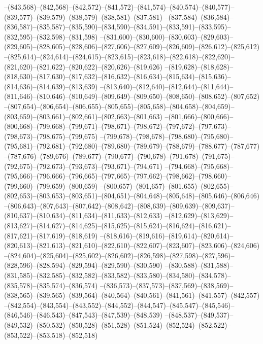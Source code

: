 --(843,568)--(842,568)--(842,572)--(841,572)--(841,574)--(840,574)--(840,577)--(839,577)--(839,579)--(838,579)--(838,581)--(837,581)
--(837,584)--(836,584)--(836,587)--(835,587)--(835,590)--(834,590)--(834,591)--(833,591)--(833,595)--(832,595)--(832,598)--(831,598)
--(831,600)--(830,600)--(830,603)--(829,603)--(829,605)--(828,605)--(828,606)--(827,606)--(827,609)--(826,609)--(826,612)--(825,612)
--(825,614)--(824,614)--(824,615)--(823,615)--(823,618)--(822,618)--(822,620)--(821,620)--(821,622)--(820,622)--(820,626)--(819,626)
--(819,628)--(818,628)--(818,630)--(817,630)--(817,632)--(816,632)--(816,634)--(815,634)--(815,636)--(814,636)--(814,639)--(813,639)
--(813,640)--(812,640)--(812,644)--(811,644)--(811,646)--(810,646)--(810,649)--(809,649)--(809,650)--(808,650)--(808,652)--(807,652)
--(807,654)--(806,654)--(806,655)--(805,655)--(805,658)--(804,658)--(804,659)--(803,659)--(803,661)--(802,661)--(802,663)--(801,663)
--(801,666)--(800,666)--(800,668)--(799,668)--(799,671)--(798,671)--(798,672)--(797,672)--(797,673)--(798,673)--(798,675)--(799,675)
--(799,678)--(798,678)--(798,680)--(795,680)--(795,681)--(792,681)--(792,680)--(789,680)--(789,679)--(788,679)--(788,677)--(787,677)
--(787,676)--(789,676)--(789,677)--(790,677)--(790,678)--(791,678)--(791,675)--(792,675)--(792,673)--(793,673)--(793,671)--(794,671)
--(794,668)--(795,668)--(795,666)--(796,666)--(796,665)--(797,665)--(797,662)--(798,662)--(798,660)--(799,660)--(799,659)--(800,659)
--(800,657)--(801,657)--(801,655)--(802,655)--(802,653)--(803,653)--(803,651)--(804,651)--(804,648)--(805,648)--(805,646)--(806,646)
--(806,643)--(807,643)--(807,642)--(808,642)--(808,639)--(809,639)--(809,637)--(810,637)--(810,634)--(811,634)--(811,633)--(812,633)
--(812,629)--(813,629)--(813,627)--(814,627)--(814,625)--(815,625)--(815,624)--(816,624)--(816,621)--(817,621)--(817,619)--(818,619)
--(818,616)--(819,616)--(819,614)--(820,614)--(820,613)--(821,613)--(821,610)--(822,610)--(822,607)--(823,607)--(823,606)--(824,606)
--(824,604)--(825,604)--(825,602)--(826,602)--(826,598)--(827,598)--(827,596)--(828,596)--(828,594)--(829,594)--(829,590)--(830,590)
--(830,588)--(831,588)--(831,585)--(832,585)--(832,582)--(833,582)--(833,580)--(834,580)--(834,578)--(835,578)--(835,574)--(836,574)
--(836,573)--(837,573)--(837,569)--(838,569)--(838,565)--(839,565)--(839,564)--(840,564)--(840,561)--(841,561)--(841,557)--(842,557)
--(842,554)--(843,554)--(843,552)--(844,552)--(844,547)--(845,547)--(845,546)--(846,546)--(846,543)--(847,543)--(847,539)--(848,539)
--(848,537)--(849,537)--(849,532)--(850,532)--(850,528)--(851,528)--(851,524)--(852,524)--(852,522)--(853,522)--(853,518)--(852,518)
